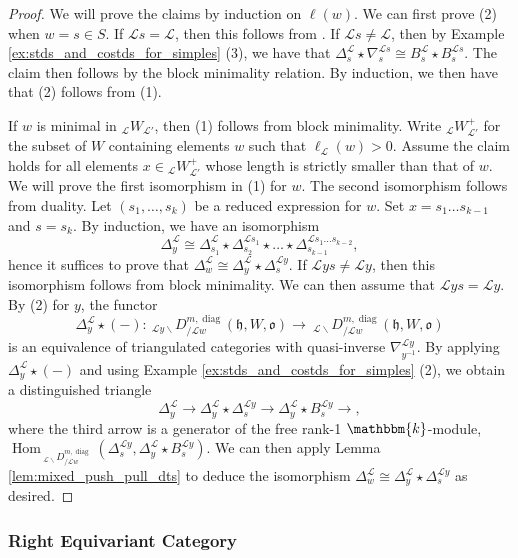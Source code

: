 \documentclass{amsart}
\renewcommand{\k}{\mathbbm{k}}
\newcommand{\scrL}{\mathcal{L}}
\DeclareMathOperator{\Hom}{Hom}
\newcommand{\fr}[1]{\mathfrak{#1}}
\DeclareMathOperator{\diag}{diag}
\newcommand{\DDBE}[2]{\:_{#1 \backslash} D_{/ #2}^{m, \diag}}
\newcommand{\W}[2]{{}_{#1}W_{#2}}
\theoremstyle{definition}
\numberwithin{equation}{subsection}
\begin{document}
\begin{proof}
    We will prove the claims by induction on $\ell (w)$. 
    We can first prove (2) when $w = s \in S$. If $\scrL s = \scrL$, then this follows from \cite[Lemma 4.2.4]{AMRW1}.
    If $\scrL s \neq \scrL$, then by Example \ref{ex:stds_and_costds_for_simples} (3), we have that $\Delta_s^{\scrL} \star \nabla_s^{\scrL s} \cong B_s^{\scrL} \star B_s^{\scrL s}$.
    The claim then follows by the block minimality relation.
    By induction, we then have that (2) follows from (1).

    If $w$ is minimal in $\W{\scrL}{\scrL'}$, then (1) follows from block minimality.
    Write $\W{\scrL}{\scrL'}^+$ for the subset of $W$ containing elements $w$ such that $\ell_{\scrL} (w) > 0$.
    Assume the claim holds for all elements $x \in \W{\scrL}{\scrL'}^+$ whose length is strictly smaller than that of $w$.
    We will prove the first isomorphism in (1) for $w$. The second isomorphism follows from duality.
    Let $(s_1, \ldots, s_k)$ be a reduced expression for $w$. Set $x = s_1\ldots s_{k-1}$ and $s = s_k$.
    By induction, we have an isomorphism
    \[\Delta_y^{\scrL} \cong \Delta_{s_1}^{\scrL} \star \Delta_{s_2}^{\scrL s_1} \star \ldots \star \Delta_{s_{k-1}}^{\scrL s_1 \ldots s_{k-2}},\]
    hence it suffices to prove that $\Delta_w^{\scrL} \cong \Delta_y^{\scrL} \star \Delta_s^{\scrL y}$. If $\scrL ys \neq \scrL y$, then this isomorphism follows from block minimality.
    We can then assume that $\scrL ys = \scrL y$. By (2) for $y$, the functor
    \[\Delta_y^{\scrL} \star (-) : \DDBE{\scrL y}{\scrL w} (\fr{h}, W, \fr{o}) \to \DDBE{\scrL}{\scrL w} (\fr{h}, W, \fr{o}) \]
    is an equivalence of triangulated categories with quasi-inverse $\nabla_{y^{-1}}^{\scrL y}$.
    By applying $\Delta_y^{\scrL} \star (-)$ and using Example \ref{ex:stds_and_costds_for_simples} (2), we obtain a distinguished triangle
    \[\Delta_y^{\scrL} \to \Delta_y^{\scrL} \star \Delta_s^{\scrL y} \to \Delta_y^{\scrL} \star B_s^{\scrL y} \to,\]
    where the third arrow is a generator of the free rank-1 $\k$-module, $\Hom_{\DDBE{\scrL}{\scrL w}} (\Delta_s^{\scrL y}, \Delta_y^{\scrL} \star B_s^{\scrL y})$.
    We can then apply Lemma \ref{lem:mixed_push_pull_dts} to deduce the isomorphism $\Delta_w^{\scrL} \cong \Delta_y^{\scrL} \star \Delta_s^{\scrL y}$ as desired.
\end{proof}

\subsubsection{Right Equivariant Category}\label{subsec:right_equiv_diagrammatic}
\end{document}
